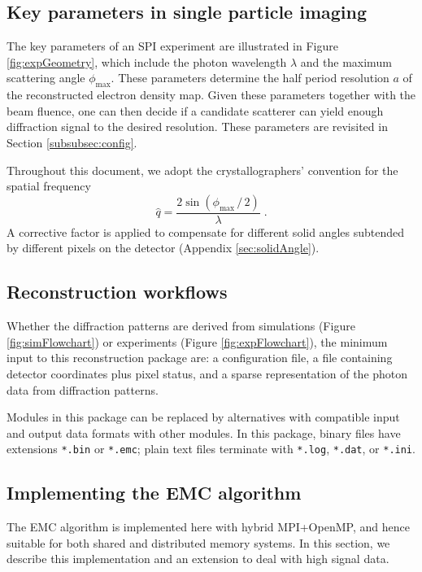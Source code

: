 \documentclass[]{iucr}              %
\begin{document}
\subsection{Key parameters in single particle imaging}\label{sec:expParams}

The key parameters of an SPI experiment are illustrated in Figure \ref{fig:expGeometry}, which include the photon wavelength $\lambda$ and the maximum scattering angle $\phi_{\text{max}}$. These parameters determine the half period resolution $a$ of the reconstructed electron density map. Given these parameters together with the beam fluence, one can then decide if a candidate scatterer can yield enough diffraction signal to the desired resolution. These parameters are revisited in Section \ref{subsubsec:config}.

Throughout this document, we adopt the crystallographers' convention for the spatial frequency 
\begin{equation}
\widehat{q} = \frac{2 \sin(\phi_{\text{max}}\,/\,2)}{\lambda}\;.
\end{equation}
A corrective factor is applied to compensate for different solid angles subtended by different pixels on the detector (Appendix \ref{sec:solidAngle}). 

\subsection{Reconstruction workflows}\label{sec:dataStreamSim}

Whether the diffraction patterns are derived from simulations (Figure \ref{fig:simFlowchart}) or experiments (Figure \ref{fig:expFlowchart}), the minimum input to this reconstruction package are: a configuration file, a file containing detector coordinates plus pixel status, and a sparse representation of the photon data from diffraction patterns. 

Modules in this package can be replaced by alternatives with compatible input and output data formats with other modules. In this package, binary files have extensions \texttt{*.bin} or \texttt{*.emc}; plain text files terminate with \texttt{*.log}, \texttt{*.dat}, or \texttt{*.ini}.

\subsection{Implementing the EMC algorithm}\label{subsec:EMC}
The EMC algorithm \cite{loh2009} is implemented here with hybrid MPI+OpenMP, and hence suitable for both shared and distributed memory systems. In this section, we describe this implementation and an extension to deal with high signal data. 
\end{document}
